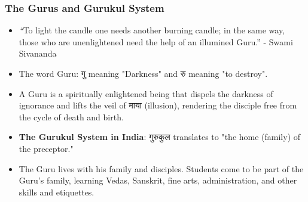 \begin{frame}[fragile]\frametitle{The Gurus and Gurukul System}
      \begin{itemize}
        \item {\textit “To light the candle one needs another burning candle; in the same way, those who are unenlightened need the help of an illumined Guru.”} - Swami Sivananda
          
          \item The word Guru:  गु meaning "Darkness" and रु meaning "to destroy". 
		  \item A Guru is a spiritually enlightened being that dispels the darkness of ignorance and lifts the veil of माया (illusion), rendering the disciple free from the cycle of death and birth.
          
          
          
          
          
        \item \textbf{The Gurukul System in India}:          गुरुकुल translates to "the home (family) of the preceptor." 
		\item The Guru lives with his family and disciples. Students come to be part of the Guru's family, learning Vedas, Sanskrit, fine arts, administration, and other skills and etiquettes.
          
          
          
          
          
          
          
      \end{itemize}
\end{frame}


